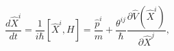 \begin{equation}
\frac{d\widehat{X}^{i}}{dt}=\frac{1}{i\hbar}[\widehat{X}^{i},H]=\frac{\hat
{p}^{i}}{m}+\frac{\theta^{ij}}{\hbar}\frac{\partial\widehat{V}(\widehat{X}%
^{i})}{\partial\widehat{X}^{j}},\label{20.5}%
\end{equation}%
